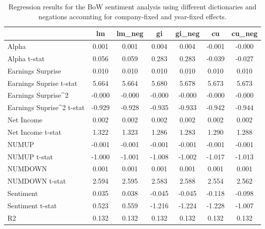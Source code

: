 \begin{table}
\caption{Regression results for the BoW sentiment analysis using different dictionaries and negations accounting for company-fixed and year-fixed effects.}
\label{tab:bow_regressions_company_and_year_fixed}
\begin{tabular}{lcccccc}
\toprule
 & lm & lm_neg & gi & gi_neg & cu & cu_neg \\
\midrule
Alpha & 0.001 & 0.001 & 0.004 & 0.004 & -0.001 & -0.000 \\
Alpha t-stat & 0.056 & 0.059 & 0.283 & 0.283 & -0.039 & -0.027 \\
Earnings Surprise & 0.010 & 0.010 & 0.010 & 0.010 & 0.010 & 0.010 \\
Earnings Suprise t-stat & 5.664 & 5.664 & 5.680 & 5.678 & 5.673 & 5.673 \\
Earnings Surprise^2 & -0.000 & -0.000 & -0.000 & -0.000 & -0.000 & -0.000 \\
Earnings Suprise^2 t-stat & -0.929 & -0.928 & -0.935 & -0.933 & -0.942 & -0.944 \\
Net Income & 0.002 & 0.002 & 0.002 & 0.002 & 0.002 & 0.002 \\
Net Income t-stat & 1.322 & 1.323 & 1.286 & 1.283 & 1.290 & 1.288 \\
NUMUP & -0.001 & -0.001 & -0.001 & -0.001 & -0.001 & -0.001 \\
NUMUP t-stat & -1.000 & -1.001 & -1.008 & -1.002 & -1.017 & -1.013 \\
NUMDOWN & 0.001 & 0.001 & 0.001 & 0.001 & 0.001 & 0.001 \\
NUMDOWN t-stat & 2.594 & 2.595 & 2.583 & 2.588 & 2.554 & 2.562 \\
Sentiment & 0.035 & 0.038 & -0.045 & -0.045 & -0.118 & -0.098 \\
Sentiment t-stat & 0.523 & 0.559 & -1.216 & -1.224 & -1.228 & -1.007 \\
R2 & 0.132 & 0.132 & 0.132 & 0.132 & 0.132 & 0.132 \\
\bottomrule
\end{tabular}
\end{table}
